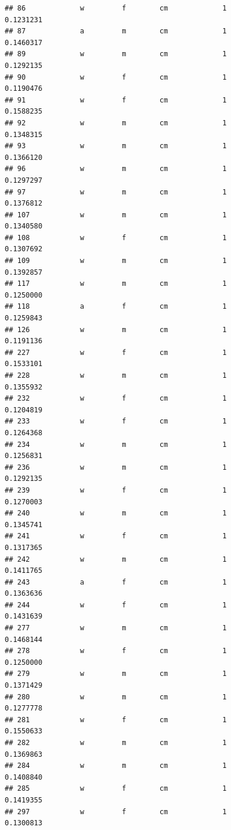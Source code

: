 \documentclass[]{article}
\begin{document}
\begin{verbatim}
## 86             w         f        cm             1          0.1231231
## 87             a         m        cm             1          0.1460317
## 89             w         m        cm             1          0.1292135
## 90             w         f        cm             1          0.1190476
## 91             w         f        cm             1          0.1588235
## 92             w         m        cm             1          0.1348315
## 93             w         m        cm             1          0.1366120
## 96             w         m        cm             1          0.1297297
## 97             w         m        cm             1          0.1376812
## 107            w         m        cm             1          0.1340580
## 108            w         f        cm             1          0.1307692
## 109            w         m        cm             1          0.1392857
## 117            w         m        cm             1          0.1250000
## 118            a         f        cm             1          0.1259843
## 126            w         m        cm             1          0.1191136
## 227            w         f        cm             1          0.1533101
## 228            w         m        cm             1          0.1355932
## 232            w         f        cm             1          0.1204819
## 233            w         f        cm             1          0.1264368
## 234            w         m        cm             1          0.1256831
## 236            w         m        cm             1          0.1292135
## 239            w         f        cm             1          0.1270003
## 240            w         m        cm             1          0.1345741
## 241            w         f        cm             1          0.1317365
## 242            w         m        cm             1          0.1411765
## 243            a         f        cm             1          0.1363636
## 244            w         f        cm             1          0.1431639
## 277            w         m        cm             1          0.1468144
## 278            w         f        cm             1          0.1250000
## 279            w         m        cm             1          0.1371429
## 280            w         m        cm             1          0.1277778
## 281            w         f        cm             1          0.1550633
## 282            w         m        cm             1          0.1369863
## 284            w         m        cm             1          0.1408840
## 285            w         f        cm             1          0.1419355
## 297            w         f        cm             1          0.1300813

\end{verbatim}
\end{document}
